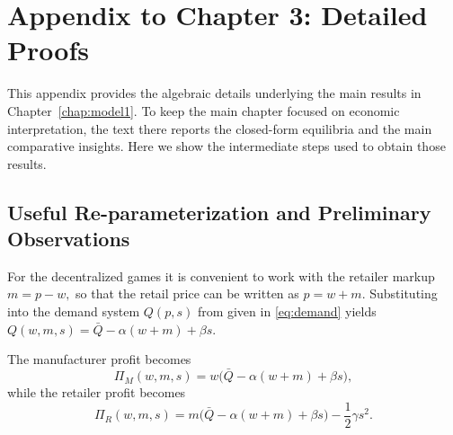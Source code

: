 \chapter{Appendix to Chapter 3: Detailed Proofs}
\label{app:ch3_proofs}

This appendix provides the algebraic details underlying the main results in
Chapter~\ref{chap:model1}. To keep the main chapter focused on economic
interpretation, the text there reports the closed-form equilibria and the main
comparative insights. Here we show the intermediate steps used to obtain those
results.

\section{Useful Re-parameterization and Preliminary Observations}
\label{app:preliminaries}

For the decentralized games it is convenient to work with the retailer markup $m = p-w,$ so that the retail price can be written as $ p=w+m.$
Substituting into the demand system $Q(p,s)$ from given in  \ref{eq:demand} 
yields  $ Q(w,m,s)=\bar Q-\alpha(w+m)+\beta s.$

The manufacturer profit becomes
\begin{equation}
 \Pi_M(w,m,s)=w\bigl(\bar Q-\alpha(w+m)+\beta s\bigr),
 \label{eq:app_piM}
\end{equation}
while the retailer profit becomes
\begin{equation}
 \Pi_R(w,m,s)=m\bigl(\bar Q-\alpha(w+m)+\beta s\bigr)-\frac{1}{2}\gamma s^2.
 \label{eq:app_piR}
\end{equation}

